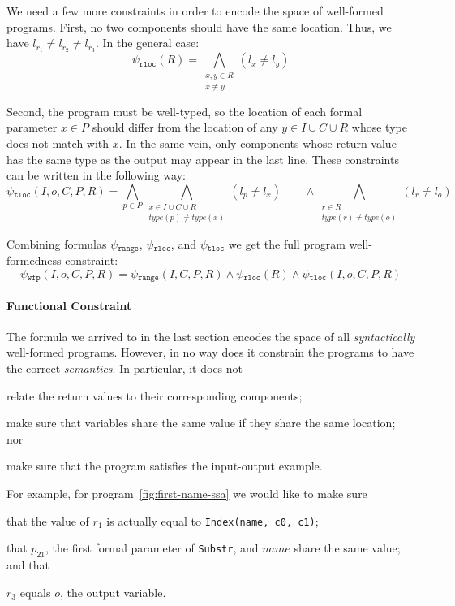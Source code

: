 We need a few more constraints in order to encode the space of well-formed
programs. First, no two components should have the same location. Thus,
we have $l_{r_1} \neq l_{r_2} \neq l_{r_3}$. In the general case:
%
\[
  \psi{}_{\mathtt{rloc}}(R) =
  \bigwedge_{\substack{x, y \in R\\ x \not\equiv y}} (l_{x} \neq l_{y}) 
\]

\noindent
Second, the program must be well-typed, so the location of each formal parameter
$x \in P$ should differ from the location of any $y \in I \cup C \cup R$ whose
type does not match with $x$. In the same vein, only components whose return
value has the same type as the output may appear in the last line. These
constraints can be written in the following way:
%
\[
  \psi{}_{\mathtt{tloc}}(I, o, C, P, R) =
  \bigwedge_{p \in P}
  \bigwedge_{\substack{x \in I \cup C \cup R \\ type(p) \neq type(x)}}
  (l_p \neq l_x)
  \qquad \wedge
  \bigwedge_{\substack{r \in R \\ type(r) \neq type(o)}}
  (l_r \neq l_o)
\]

Combining formulas $\psi{}_{\mathtt{range}}$, $\psi{}_{\mathtt{rloc}}$, and
$\psi{}_{\mathtt{tloc}}$ we get the full program well-formedness constraint:
%
\[
  \psi{}_{\mathtt{wfp}}(I, o, C, P, R) =
  \psi{}_{\mathtt{range}}(I, C, P, R)
  \wedge \psi{}_{\mathtt{rloc}}(R)
  \wedge \psi{}_{\mathtt{tloc}}(I, o, C, P, R)
\]

\paragraph{Functional Constraint}
\label{sec:functional-constraint}

The formula we arrived to in the last section encodes the space of all
\textit{syntactically} well-formed programs. However, in no way does it
constrain the programs to have the correct \textit{semantics}.
In particular, it does not
\begin{enumerate*}[(1)]
\item \label{itm:fc-one} relate the return values to their corresponding components;
\item \label{itm:fc-two} make sure that variables share the same value if they share the same
location; nor
\item \label{itm:fc-three} make sure that the program satisfies the input-output example.
\end{enumerate*}
For example, for program~\ref{fig:first-name-ssa} we would like to make sure
\begin{enumerate*}[(1)]
\item that the value of $r_1$ is actually equal to \lstinline{Index(name, c0, c1)};
\item that $p_{21}$, the first formal parameter of \lstinline{Substr}, and $name$
  share the same value; and that
\item $r_3$ equals $o$, the output variable.
\end{enumerate*}

